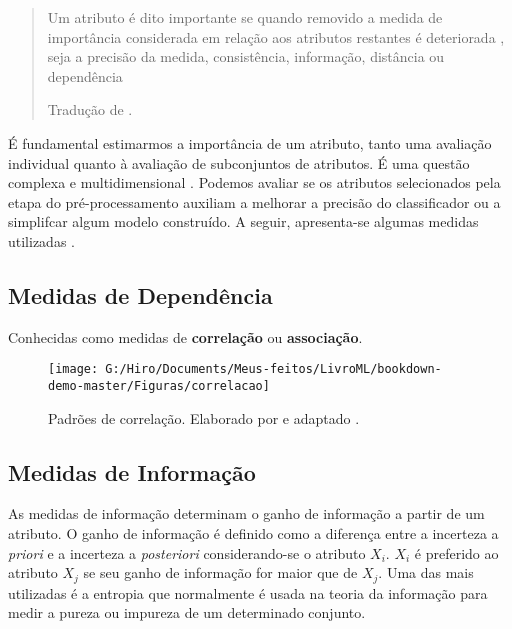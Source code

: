 \documentclass[
  openany]{book}
\begin{document}
\begin{quote}
Um atributo é dito importante se quando removido a medida de importância considerada em relação aos atributos restantes é deteriorada , seja a precisão da medida, consistência, informação, distância ou dependência

Tradução de \citet{liu2012feature}.
\end{quote}

É fundamental estimarmos a importância de um atributo, tanto uma avaliação individual quanto à avaliação de subconjuntos de atributos. É uma questão complexa e multidimensional \citep{liu2012feature}. Podemos avaliar se os atributos selecionados pela etapa do pré-processamento auxiliam a melhorar a precisão do classificador ou a simplifcar algum modelo construído. A seguir, apresenta-se algumas medidas utilizadas \citep{lee2005seleccao}.

\hypertarget{medidasdep}{%
\subsection{Medidas de Dependência}\label{medidasdep}}

Conhecidas como medidas de \textbf{correlação} ou \textbf{associação}.

\begin{figure}

{\centering \texttt{[image: G:/Hiro/Documents/Meus-feitos/LivroML/bookdown-demo-master/Figuras/correlacao]} 

}

\caption{Padrões de correlação. Elaborado por \citet{gujarati2011econometria} e adaptado \citet{theil1978}.}\label{fig:correlacao}
\end{figure}



\hypertarget{medinfo}{%
\subsection{Medidas de Informação}\label{medinfo}}

As medidas de informação determinam o ganho de informação a partir de um atributo. O ganho de informação é definido como a diferença entre a incerteza a \emph{priori} e a incerteza a \emph{posteriori} considerando-se o atributo \(X_i\). \(X_i\) é preferido ao atributo \(X_j\) se seu ganho de informação for maior que de \(X_j\). Uma das mais utilizadas é a entropia que normalmente é usada na teoria da informação para medir a pureza ou impureza de um determinado conjunto.
\end{document}
